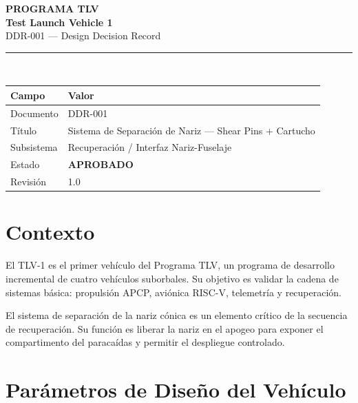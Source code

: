 \documentclass[11pt, a4paper]{article}
\begin{document}
\thispagestyle{empty}

\vspace*{3cm}
\begin{center}
  {\large\color{tlvgray}\textbf{PROGRAMA TLV}}\\[0.4cm]
  {\Huge\color{tlvnavy}\textbf{Test Launch Vehicle 1}}\\[0.3cm]
  {\Large\color{tlvblue}DDR-001 — Design Decision Record}\\[1.2cm]
  \rule{0.6\linewidth}{1pt}\\[0.8cm]

  \begin{tabular}{ll}
    \toprule
    \rowcolor{tlvnavy}
    \color{white}\textbf{Campo} & \color{white}\textbf{Valor} \\
    \midrule
    \rowcolor{tlvlight} Documento     & DDR-001 \\
    Título        & Sistema de Separación de Nariz — Shear Pins + Cartucho \\
    \rowcolor{tlvlight} Subsistema    & Recuperación / Interfaz Nariz-Fuselaje \\
    Estado        & \textcolor{tlvgreen}{\textbf{APROBADO}} \\
    \rowcolor{tlvlight} Revisión      & 1.0 \\
    \bottomrule
  \end{tabular}
\end{center}
\newpage

\section{Contexto}

El TLV-1 es el primer vehículo del Programa TLV, un programa de desarrollo incremental de cuatro vehículos suborbales. Su objetivo es validar la cadena de sistemas básica: propulsión APCP, aviónica RISC-V, telemetría y recuperación.

El sistema de separación de la nariz cónica es un elemento crítico de la secuencia de recuperación. Su función es liberar la nariz en el apogeo para exponer el compartimento del paracaídas y permitir el despliegue controlado.

\section{Parámetros de Diseño del Vehículo}
\end{document}
